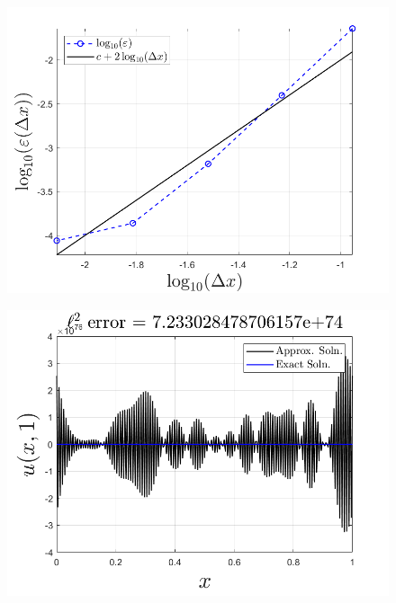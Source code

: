 \documentclass{article}
\begin{document}
\begin{itemize}
\begin{itemize}
\begin{figure}[H]
\begin{center}
                \includegraphics[scale = 0.3]{prob_1_2log_err.png}
            \end{center}
        \end{figure}
        \begin{figure}[H]
            \begin{center}
                \includegraphics[scale = 0.3]{prob_1_2_nx_257.png}
            \end{center}
        \end{figure}
        
    \end{itemize}



\end{itemize}
\end{document}
